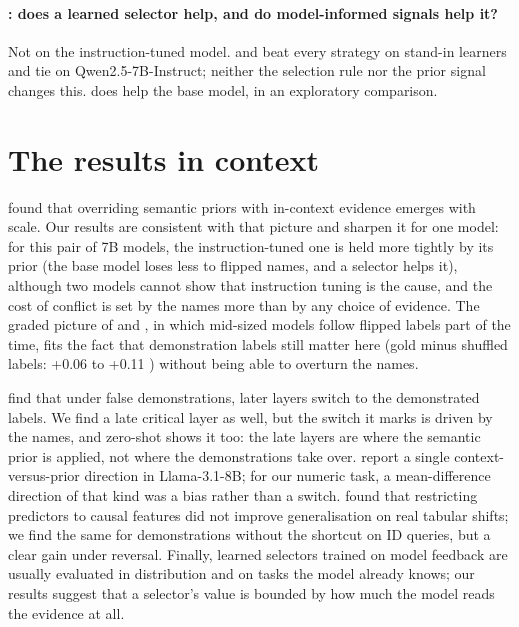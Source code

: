 \paragraph{: does a learned selector help, and do model-informed signals help it?}
Not on the instruction-tuned model.
\sata and \satami beat every strategy on stand-in learners and tie on Qwen2.5-7B-Instruct; neither the selection rule nor the prior signal changes this.
\sata does help the base model, in an exploratory comparison.

\section{The results in context}

\citet{wei2023larger} found that overriding semantic priors with in-context evidence emerges with scale.
Our results are consistent with that picture and sharpen it for one model: for this pair of 7B models, the instruction-tuned one is held more tightly by its prior (the base model loses less to flipped names, and a selector helps it), although two models cannot show that instruction tuning is the cause, and the cost of conflict is set by the names more than by any choice of evidence.
The graded picture of \citet{krishnakumar2025semantic} and \citet{kossen2024incontext}, in which mid-sized models follow flipped labels part of the time, fits the fact that demonstration labels still matter here (gold minus shuffled labels: +0.06 to +0.11 \AUROC) without being able to overturn the names.

\citet{halawi2024overthinking} find that under false demonstrations, later layers switch to the demonstrated labels.
We find a late critical layer as well, but the switch it marks is driven by the names, and zero-shot shows it too: the late layers are where the semantic prior is applied, not where the demonstrations take over.
\citet{minder2025controllable} report a single context-versus-prior direction in Llama-3.1-8B; for our numeric task, a mean-difference direction of that kind was a bias rather than a switch.
\citet{nastl2024causal} found that restricting predictors to causal features did not improve generalisation on real tabular shifts; we find the same for demonstrations without the shortcut on ID queries, but a clear gain under reversal.
Finally, learned selectors trained on model feedback \citep{rubin2022learning,ye2023compositional} are usually evaluated in distribution and on tasks the model already knows; our results suggest that a selector's value is bounded by how much the model reads the evidence at all.

